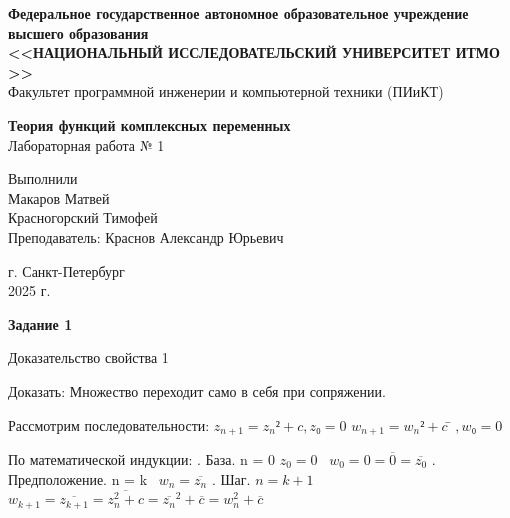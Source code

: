 \documentclass[a4paper,12pt]{article}
\begin{document}
\begin{center}
\textbf{Федеральное государственное автономное образовательное учреждение высшего образования}\\
\textbf{<<НАЦИОНАЛЬНЫЙ ИССЛЕДОВАТЕЛЬСКИЙ 
УНИВЕРСИТЕТ ИТМО
>>}\\[0.5em]
Факультет программной инженерии и компьютерной техники (ПИиКТ)\\
\end{center}

\vspace{7cm}

\begin{center}
\textbf{Теория функций комплексных переменных}\\[0.5em]
Лабораторная работа № 1\\[0.5em]
\end{center}

\vfill

\hfill
\begin{minipage}{0.95\textwidth}
Выполнили\\
Макаров Матвей\\
Красногорский Тимофей\\[1em]
Преподаватель: Краснов Александр Юрьевич
\end{minipage}

\vspace{1cm}

\begin{center}
г. Санкт-Петербург\\
2025 г. 
\end{center}
\pagebreak

\begin{center}
    \textbf{Задание 1}
\end{center}

Доказательство свойства 1

Доказать: Множество переходит само в себя при сопряжении. \newline

Рассмотрим последовательности: \newline
         $z_{n+1} = z_n² + c, z₀ = 0$ \newline
         $w_{n+1} = w_n² + c̄, w₀ = 0$ \newline
         
По математической индукции: . База. n = 0 \newline
 $z_0 = 0$ \newline
\ $w_0 = 0 = \overline{0}=\overline{z_0}$ . Предположение. n = k \newline
 \ $ w_n = \overline{z_n}$ . Шаг. $n = k+1$ \newline
\ $w_{k+1}=\overline{z_{k+1}}=\overline{z_{n}^2+c}=\overline{z_n}^2+\overline{c}=w_n^2+\overline{c}$ \newline
\end{document}
